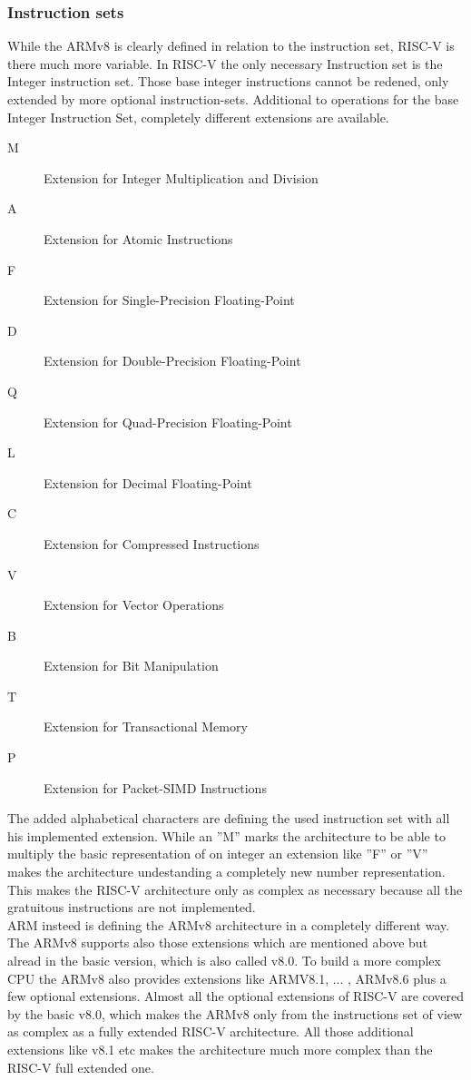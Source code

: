 \documentclass[conference]{IEEEtran}
\begin{document}
	\subsubsection{Instruction sets}
	While the ARMv8 is clearly defined in relation to the instruction set, RISC-V is there much more variable. In RISC-V the only necessary Instruction set is the Integer instruction set. Those base integer instructions cannot be redened, only extended by more optional instruction-sets. Additional to operations for the base Integer Instruction Set, completely different extensions are available.
	\begin{description}
	\item[M]	Extension for Integer Multiplication and Division
	\item[A]	Extension for Atomic Instructions
	\item[F]	Extension for Single-Precision Floating-Point
	\item[D]	Extension for Double-Precision Floating-Point
	\item[Q]	Extension for Quad-Precision Floating-Point
	\item[L]	Extension for Decimal Floating-Point
	\item[C] 	Extension for Compressed Instructions
	\item[V]	Extension for Vector Operations
	\item[B]	Extension for Bit Manipulation
	\item[T]	Extension for Transactional Memory
	\item[P]	Extension for Packet-SIMD Instructions
	\end{description}
The added alphabetical characters are defining the used instruction set with all his implemented extension. While an ''M'' marks the architecture to be able to multiply the basic representation of on integer an extension like ''F'' or ''V'' makes the architecture undestanding a completely new number representation. This makes the RISC-V architecture only as complex as necessary because all the gratuitous instructions are not implemented. \cite{Asanovic2016} \\
ARM insteed is defining the ARMv8 architecture in a completely different way. The ARMv8 supports also those extensions which are mentioned above but alread in the basic version, which is also called v8.0. To build a more complex CPU the ARMv8 also provides extensions like ARMV8.1, ... , ARMv8.6 plus a few optional extensions.  Almost all the optional extensions of RISC-V are covered by the basic v8.0, which makes the ARMv8 only from the instructions set of view as complex as a fully extended RISC-V architecture. All those additional extensions like v8.1 etc makes the architecture much more complex than the RISC-V full extended one. \cite{ArmManual} \\
\end{document}
